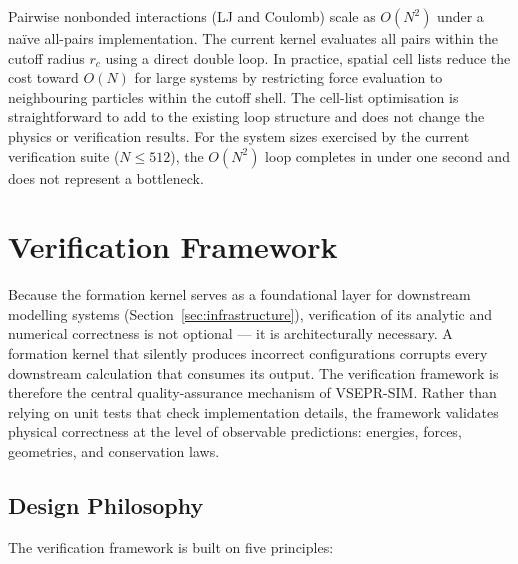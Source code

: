 \documentclass[11pt,twoside]{article}
\begin{document}
Pairwise nonbonded interactions (LJ and Coulomb) scale as $O(N^2)$ under a na\"ive all-pairs implementation. The current kernel evaluates all pairs within the cutoff radius $r_c$ using a direct double loop. In practice, spatial cell lists reduce the cost toward $O(N)$ for large systems by restricting force evaluation to neighbouring particles within the cutoff shell. The cell-list optimisation is straightforward to add to the existing loop structure and does not change the physics or verification results. For the system sizes exercised by the current verification suite ($N \leq 512$), the $O(N^2)$ loop completes in under one second and does not represent a bottleneck.


\section{Verification Framework}
\label{sec:framework}

Because the formation kernel serves as a foundational layer for downstream modelling systems (Section~\ref{sec:infrastructure}), verification of its analytic and numerical correctness is not optional --- it is architecturally necessary. A formation kernel that silently produces incorrect configurations corrupts every downstream calculation that consumes its output. The verification framework is therefore the central quality-assurance mechanism of VSEPR-SIM. Rather than relying on unit tests that check implementation details, the framework validates physical correctness at the level of observable predictions: energies, forces, geometries, and conservation laws.

\subsection{Design Philosophy}

The verification framework is built on five principles:
\end{document}
